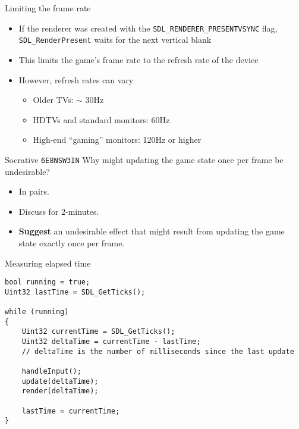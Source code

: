\begin{frame}{Limiting the frame rate}
    \begin{itemize}
        \item If the renderer was created with the \lstinline{SDL_RENDERER_PRESENTVSYNC} flag,
            \lstinline{SDL_RenderPresent} waits for the next vertical blank
        \item This limits the game's frame rate to the refresh rate of the device
        \item However, refresh rates can vary
            \begin{itemize}
                \item Older TVs: $\sim$ 30Hz
                \item HDTVs and standard monitors: 60Hz
                \item High-end ``gaming'' monitors: 120Hz or higher
            \end{itemize}
    \end{itemize}
\end{frame}

\begin{frame}{Socrative \texttt{6E8NSW3IN}}
    Why might updating the game state once per frame be undesirable?
	\begin{itemize}
		\item In pairs.
		\item Discuss for 2-minutes.
		\item \textbf{Suggest} an undesirable effect that might result from updating the game state exactly once per frame.
	\end{itemize}
\end{frame}

\begin{frame}[fragile]{Measuring elapsed time}
    \begin{lstlisting}
bool running = true;
Uint32 lastTime = SDL_GetTicks();

while (running)
{
    Uint32 currentTime = SDL_GetTicks();
    Uint32 deltaTime = currentTime - lastTime;
    // deltaTime is the number of milliseconds since the last update
    
    handleInput();
    update(deltaTime);
    render(deltaTime);
    
    lastTime = currentTime;
}
    \end{lstlisting}
\end{frame}

